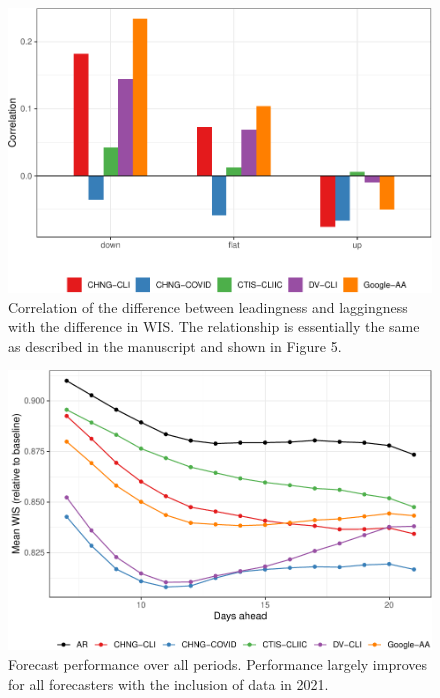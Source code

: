 \documentclass[9pt,twoside,lineno]{pnas-new}
\begin{document}
\clearpage

\begin{figure}

{\centering \includegraphics[width=\textwidth]{fig/diff-in-lead-lag-1} 

}

\caption{Correlation of the difference between leadingness and laggingness with the difference in WIS. The relationship is essentially the same as described in the manuscript and shown in Figure 5.}\label{fig:diff-in-lead-lag}
\end{figure}

\clearpage

\begin{figure}

{\centering \includegraphics[width=\textwidth]{fig/fcast-alldates-1} 

}

\caption{Forecast performance over all periods. Performance largely improves for all forecasters with the inclusion of data in 2021.}\label{fig:fcast-alldates}
\end{figure}
\end{document}
